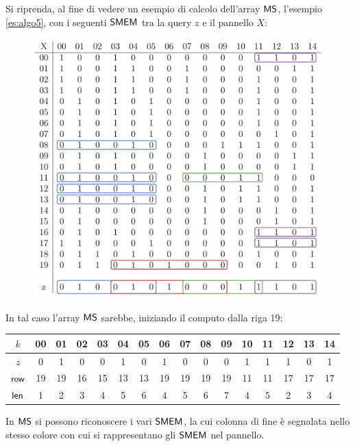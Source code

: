 \begin{esempio}
  \label{es:ms}
  Si riprenda, al fine di vedere un esempio di calcolo dell'array $\mbox{\rm {\sf MS}}$,
  l'esempio \ref{es:algo5}, con i seguenti $\mbox{\rm {\sf SMEM}}$ tra la query $z$ e il
  pannello $X$:
  \begin{figure}[H]
    \centering
    \includegraphics[scale = 0.345]{img/pbwtmatch.pdf}
  \end{figure}
  In tal caso l'array $\mbox{\rm {\sf MS}}$ sarebbe, iniziando il computo dalla riga 19:
  \begin{table}[H]
    \footnotesize
    \centering
    \begin{tabular}{c|ccccccccccccccc}
      $k$ & 00 & 01 & 02 & 03 & 04 &  {\color{nordcyan}05} & 06 & 07 & 08
      &  {\color{nordred}09} & 10 &  {\color{nordgreen}11} & 12 & 13
      &  {\color{nordpurple}14} \\
      \hline
      \hline
      $z$ & 0 & 1 & 0 & 0 & 1 &  {\color{nordcyan}0} & 1 & 0 & 0
      &  {\color{nordred}0} & 1 &  {\color{nordgreen}1} & 1 & 0
      &  {\color{nordpurple}1} \\
      \hline
      $\mbox{\rm {\sf row}}$ & 19 & 19 & 16 & 15 & 13 &  {\color{nordcyan}13} & 19 & 19 & 19
      &  {\color{nordred}19} & 11 &  {\color{nordgreen}11} & 17 & 17
      &  {\color{nordpurple}17} \\
      $\mbox{\rm {\sf len}}$ & 1 & 2 & 3 & 4 & 5 & {\color{nordcyan}6} & 4 & 5 & 6
      & {\color{nordred}7} & 4 & {\color{nordgreen}5} & 2 & 3
      & {\color{nordpurple}4}\\
    \end{tabular}
  \end{table}
  In $\mbox{\rm {\sf MS}}$ si possono riconoscere i vari $\mbox{\rm {\sf SMEM}}$, la cui colonna di fine è
  segnalata nello stesso colore con cui si rappresentano gli $\mbox{\rm {\sf SMEM}}$ nel
  pannello. 
\end{esempio}
